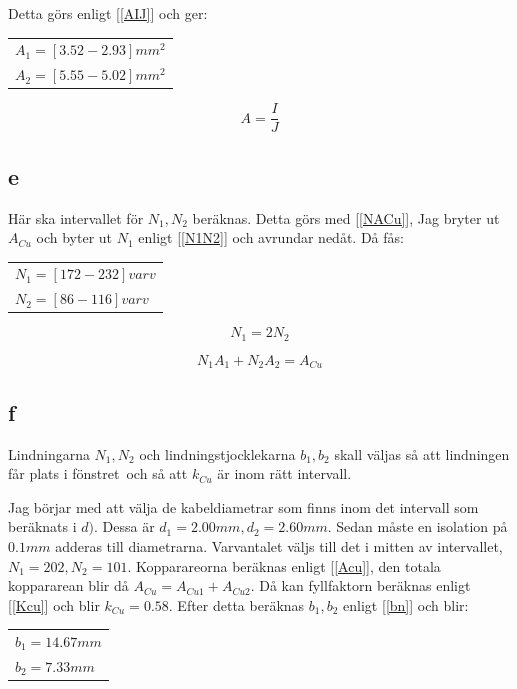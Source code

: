 \documentclass{article}
\begin{document}
Detta görs enligt [\ref{AIJ}] och ger:
\begin{tabular}{|l}
  $A_1=[ 3.52 - 2.93] mm^2$\\
  $A_2=[ 5.55 - 5.02] mm^2$\\
\end{tabular}

\begin{equation}
  A=\frac{I}{J}
  \label{AIJ}
\end{equation}

\subsection{e}
Här ska intervallet för $N_1,N_2$ beräknas.
Detta görs med [\ref{NACu}], Jag bryter ut $A_{Cu}$ och byter ut $N_1$ enligt [\ref{N1N2}] och avrundar nedåt.
Då fås:

\begin{tabular}{|l}
  $N_1=[ 172 - 232]  varv$\\
  $N_2=[ 86 - 116]  varv$\\
\end{tabular}

\begin{equation}
  N_1=2N_2
  \label{N1N2}
\end{equation}

\begin{equation}
  N_1A_1+N_2A_2=A_{Cu}
  \label{NACu}
\end{equation}


\subsection{f}
Lindningarna $N_1,N_2$ och lindningstjocklekarna $b_1,b_2$ skall väljas så att lindningen får plats i fönstret\
och så att $k_{Cu}$ är inom rätt intervall.

Jag börjar med att välja de kabeldiametrar som finns inom det intervall som beräknats i $d)$.
Dessa är $d_1=2.00 mm,d_2=2.60 mm$.
Sedan måste en isolation på $0.1 mm$ adderas till diametrarna.
Varvantalet väljs till det i mitten av intervallet, $N_1=202, N_2=101$.
Kopparareorna beräknas enligt [\ref{Acu}], den totala koppararean blir då $A_{Cu}=A_{Cu1}+A_{Cu2}$.
Då kan fyllfaktorn beräknas enligt [\ref{Kcu}] och blir $k_{Cu}= 0.58$.
Efter detta beräknas $b_1,b_2$ enligt [\ref{bn}] och blir:
\begin{tabular}{|l}
  $b_1=14.67 mm$\\
  $b_2=7.33 mm$\\
\end{tabular}
\end{document}
